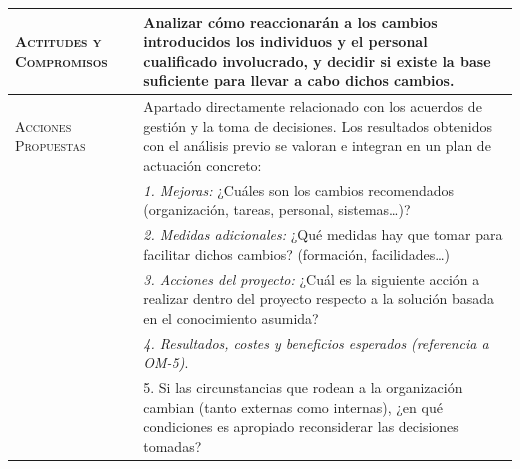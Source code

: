 \documentclass[12pt,a4paper,twoside,spanish]{article}      %
\begin{document}
\begin{table}[H]
\begin{tabularx}{\textwidth}{|p{4cm}|X|}
                    \textsc{Actitudes y Compromisos} &  Analizar cómo reaccionarán a los cambios introducidos los individuos y el personal cualificado
                    involucrado, y decidir si existe la base suficiente para llevar a cabo dichos cambios. \\ \hline
                    
                    \textsc{Acciones Propuestas} &  Apartado directamente relacionado con los acuerdos de gestión y la toma de decisiones. Los resultados obtenidos con el análisis previo se valoran e integran en un plan de actuación concreto: \\
                    
                    & \textit{1. Mejoras:} ¿Cuáles son los cambios recomendados (organización, tareas, personal, sistemas\ldots)?\\
                    & \textit{2. Medidas adicionales:} ¿Qué medidas hay que tomar para facilitar dichos cambios? (formación, facilidades\ldots)\\
                    & \textit{3. Acciones del proyecto:} ¿Cuál es la siguiente acción a realizar dentro del proyecto respecto a la solución basada en el conocimiento asumida?\\
                    & \textit{4. Resultados, costes y beneficios esperados} \emph{(referencia a OM-5)}.\\
                    & 5. Si las circunstancias que rodean a la organización cambian (tanto externas como internas), ¿en qué condiciones es apropiado reconsiderar las decisiones tomadas? \\ \hline
                \end{tabularx}
                  \label{tab.OTA1}
            \end{table}
            
        
\end{document}
